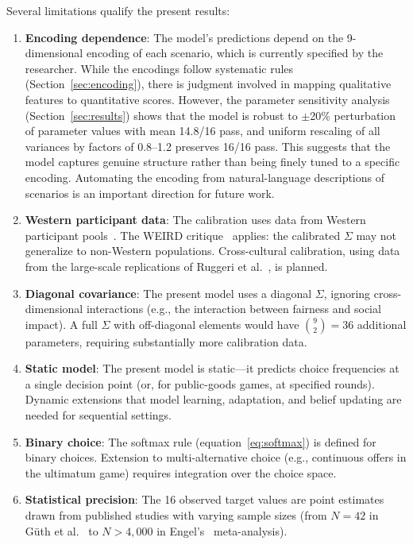 \documentclass[journal]{IEEEtran}
\begin{document}
Several limitations qualify the present results:
\begin{enumerate}
    \item \textbf{Encoding dependence}: The model's predictions depend on the 9-dimensional encoding of each scenario, which is currently specified by the researcher.
    While the encodings follow systematic rules (Section~\ref{sec:encoding}), there is judgment involved in mapping qualitative features to quantitative scores.
    However, the parameter sensitivity analysis (Section~\ref{sec:results}) shows that the model is robust to $\pm$20\% perturbation of parameter values with mean 14.8/16 pass, and uniform rescaling of all variances by factors of 0.8--1.2 preserves 16/16 pass.
    This suggests that the model captures genuine structure rather than being finely tuned to a specific encoding.
    Automating the encoding from natural-language descriptions of scenarios is an important direction for future work.
    \item \textbf{Western participant data}: The calibration uses data from Western participant pools~\cite{fraser2020,engel2011,guth1982}.
    The WEIRD critique~\cite{henrich2010} applies: the calibrated $\Sigma$ may not generalize to non-Western populations.
    Cross-cultural calibration, using data from the large-scale replications of Ruggeri et al.~\cite{ruggeri2020}, is planned.
    \item \textbf{Diagonal covariance}: The present model uses a diagonal $\Sigma$, ignoring cross-dimensional interactions (e.g., the interaction between fairness and social impact).
    A full $\Sigma$ with off-diagonal elements would have $\binom{9}{2} = 36$ additional parameters, requiring substantially more calibration data.
    \item \textbf{Static model}: The present model is static---it predicts choice frequencies at a single decision point (or, for public-goods games, at specified rounds).
    Dynamic extensions that model learning, adaptation, and belief updating are needed for sequential settings.
    \item \textbf{Binary choice}: The softmax rule (equation~\eqref{eq:softmax}) is defined for binary choices.
    Extension to multi-alternative choice (e.g., continuous offers in the ultimatum game) requires integration over the choice space.
    \item \textbf{Statistical precision}: The 16 observed target values are point estimates drawn from published studies with varying sample sizes (from $N=42$ in G\"{u}th et al.~\cite{guth1982} to $N>4{,}000$ in Engel's~\cite{engel2011} meta-analysis).

\end{enumerate}
\end{document}
